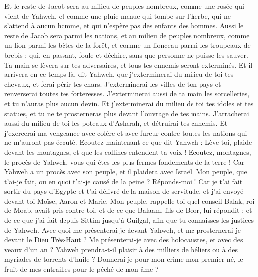 \begin{multicols}{2}
Et le reste de Jacob sera au milieu de peuples nombreux, comme une rosée qui vient de Yahweh, et comme une pluie menue qui tombe sur l'herbe, qui ne s'attend à aucun homme, et qui n'espère pas des enfants des hommes.
Aussi le reste de Jacob sera parmi les nations, et au milieu de peuples nombreux, comme un lion parmi les bêtes de la forêt, et comme un lionceau parmi les troupeaux de brebis ; qui, en passant, foule et déchire, sans que personne ne puisse les sauver.
Ta main se lèvera sur tes adversaires, et tous tes ennemis seront exterminés.
Et il arrivera en ce temps-là, dit Yahweh, que j'exterminerai du milieu de toi tes chevaux, et ferai périr tes chars.
J'exterminerai les villes de ton pays et renverserai toutes tes forteresses.
J'exterminerai aussi de ta main les sorcelleries, et tu n'auras plus aucun devin.
Et j'exterminerai du milieu de toi tes idoles et tes statues, et tu ne te prosterneras plus devant l'ouvrage de tes mains.
J'arracherai aussi du milieu de toi les poteaux d'Asherah, et détruirai tes ennemis.
Et j'exercerai ma vengeance avec colère et avec fureur contre toutes les nations qui ne m'auront pas écouté.
\VerseOne{}Ecoutez maintenant ce que dit Yahweh : Lève-toi, plaide devant les montagnes, et que les collines entendent ta voix !
Ecoutez, montagnes, le procès de Yahweh, vous qui êtes les plus fermes fondements de la terre ! Car Yahweh a un procès avec son peuple, et il plaidera avec Israël.
Mon peuple, que t'ai-je fait, ou en quoi t'ai-je causé de la peine ? Réponds-moi !
Car je t'ai fait sortir du pays d'Egypte et t'ai délivré de la maison de servitude, et j'ai envoyé devant toi Moïse, Aaron et Marie.
Mon peuple, rappelle-toi quel conseil Balak, roi de Moab, avait pris contre toi, et de ce que Balaam, fils de Beor, lui répondit ; et de ce que j'ai fait depuis Sittim jusqu'à Guilgal, afin que tu connaisses les justices de Yahweh.
Avec quoi me présenterai-je devant Yahweh, et me prosternerai-je devant le Dieu Très-Haut ? Me présenterai-je avec des holocaustes, et avec des veaux d'un an ?
Yahweh prendra-t-il plaisir à des milliers de béliers ou à des myriades de torrents d'huile ? Donnerai-je pour mon crime mon premier-né, le fruit de mes entrailles pour le péché de mon âme ?

\end{multicols}
